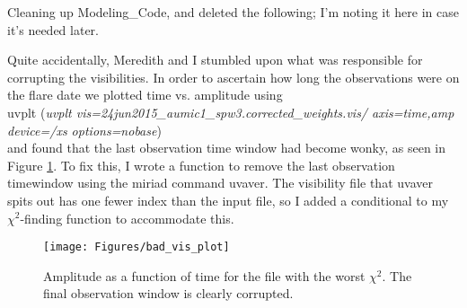\documentclass[a4paper]{tufte-handout}
\begin{document}
Cleaning up Modeling\_Code, and deleted the following;
I'm noting it here in case it's needed later.\\


\hrulefill


Quite accidentally, Meredith and I stumbled upon what was responsible for corrupting the visibilities. In order to ascertain how long the observations were on the flare date we plotted time vs. amplitude using\\
uvplt (\textit{uvplt vis=24jun2015\_aumic1\_spw3.corrected\_weights.vis/ axis=time,amp device=/xs options=nobase})\\
and found that the last observation time window had become wonky, as seen in Figure \ref{fig:bad_vis}. To fix this, I wrote a function to remove the last observation timewindow using the miriad command uvaver. The visibility file that uvaver spits out has one fewer index than the input file, so I added a conditional to my $\chi^2$-finding function to accommodate this.

\begin{figure}[!ht]
	\label{fig:bad_vis}
	\centering
	\caption{Amplitude as a function of time for the file with the worst $\chi^2$. The final observation window is clearly corrupted.}

	\texttt{[image: Figures/bad\_vis\_plot]}
\end{figure}


\hrulefill

\end{document}
